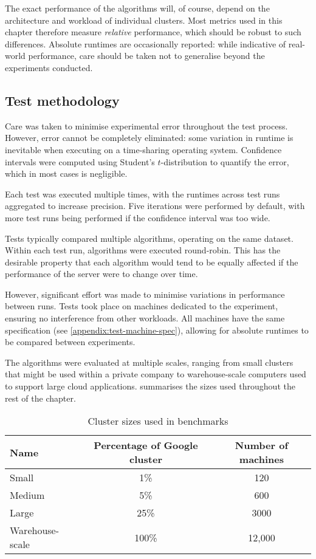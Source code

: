 The exact performance of the algorithms will, of course, depend on the architecture and workload of individual clusters. Most metrics used in this chapter therefore measure \emph{relative} performance, which should be robust to such differences. Absolute runtimes are occasionally reported: while indicative of real-world performance, care should be taken not to generalise beyond the experiments conducted.


\subsection{Test methodology} \label{sec:eval-benchmark-strategy-methodology}

Care was taken to minimise experimental error throughout the test process. However, error cannot be completely eliminated: some variation in runtime is inevitable when executing on a time-sharing operating system. Confidence intervals were computed using Student's $t$-distribution to quantify the error, which in most cases is negligible.

Each test was executed multiple times, with the runtimes across test runs aggregated to increase precision. Five iterations were performed by default, with more test runs being performed if the confidence interval was too wide.

Tests typically compared multiple algorithms, operating on the same dataset. Within each test run, algorithms were executed round-robin. This has the desirable property that each algorithm would tend to be equally affected if the performance of the server were to change over time.

However, significant effort was made to minimise variations in performance between runs. Tests took place on machines dedicated to the experiment, ensuring no interference from other workloads. All machines have the same specification (see \cref{appendix:test-machine-spec}), allowing for absolute runtimes to be compared between experiments.

The algorithms were evaluated at multiple scales, ranging from small clusters that might be used within a private company to warehouse-scale computers used to support large cloud applications.  summarises the sizes used throughout the rest of the chapter.

\begin{table}
    \centering
    \begin{tabular}{lcc}
        \textbf{Name} & \textbf{Percentage of Google cluster} & \textbf{Number of machines} \tabularnewline
        \hline
        Small & 1\% & 120 \tabularnewline
        Medium & 5\% & 600 \tabularnewline
        Large & 25\% & 3000 \tabularnewline 
        Warehouse-scale & 100\% & 12,000 \tabularnewline
    \end{tabular}
    \caption{Cluster sizes used in benchmarks}
    \label{table:cluster-sizes}
\end{table}

